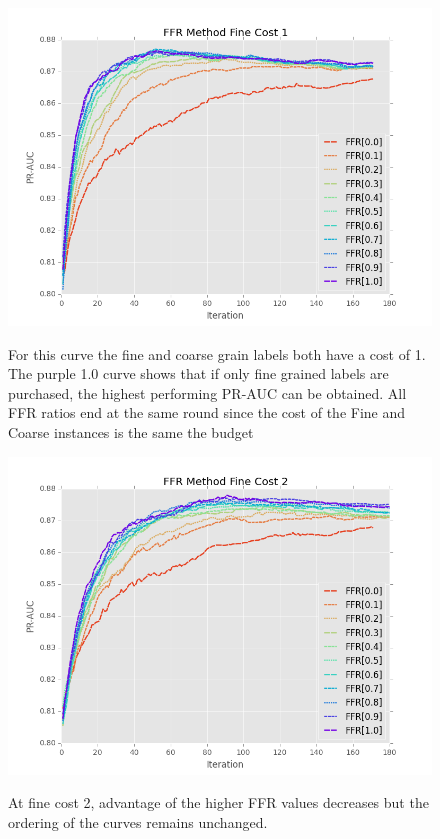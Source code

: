\documentclass[ms]{nuthesis}
\begin{document}
\FloatBarrier
\begin{figure}[!htb]
	\centering
    \includegraphics[width=1.0\columnwidth]{fig/ParamsFFR_PR_Cost1_rnds0_180}
    \label{fig:ParamsFFR_PR_Cost1_rnds0_180}
    \caption{For this curve the fine and coarse grain labels
    both have a cost of 1. The purple 1.0 curve shows that if only fine grained labels
    are purchased, the highest performing PR-AUC can be obtained. All FFR ratios end at the same round
    since the cost of the Fine and Coarse instances is the same the budget}
\end{figure}
\FloatBarrier


\FloatBarrier
\begin{figure}[!htb]
	\centering
    \includegraphics[width=1.0\columnwidth]{fig/ParamsFFR_PR_Cost2_rnds0_180}
    \label{fig:ParamsFFR_PR_Cost2_rnds0_180}
    \caption{At fine cost 2, advantage of the higher FFR values decreases but the ordering
    of the curves remains unchanged.}
\end{figure}
\FloatBarrier
\end{document}

